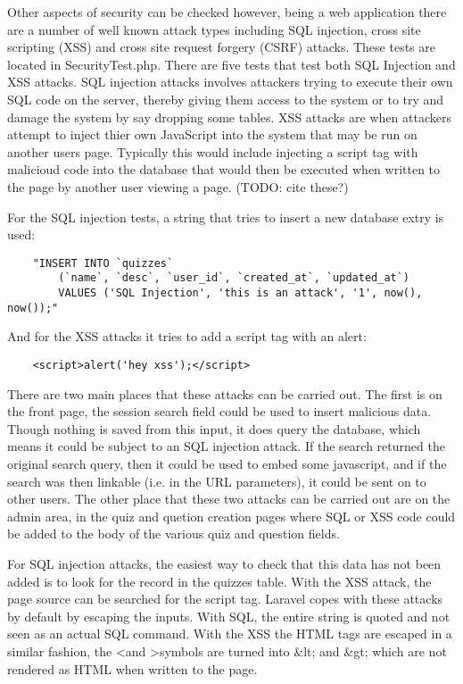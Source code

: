 Other aspects of security can be checked however, being a web application there are a number of well known attack types including SQL injection, cross site scripting (XSS) and cross site request forgery (CSRF) attacks. These tests are located in SecurityTest.php. There are five tests that test both SQL Injection and XSS attacks. SQL injection attacks involves attackers trying to execute their own SQL code on the server, thereby giving them access to the system or to try and damage the system by say dropping some tables. XSS attacks are when attackers attempt to inject thier own JavaScript into the system that may be run on another users page. Typically this would include injecting a script tag with malicioud code into the database that would then be executed when written to the page by another user viewing a page. (TODO: cite these?) 

For the SQL injection tests, a string that tries to insert a new database extry is used:
\begin{verbatim}
	"INSERT INTO `quizzes` 
		(`name`, `desc`, `user_id`, `created_at`, `updated_at`) 
		VALUES ('SQL Injection', 'this is an attack', '1', now(), now());"
\end{verbatim}
And for the XSS attacks it tries to add a script tag with an alert:
\begin{verbatim}
	<script>alert('hey xss');</script>
\end{verbatim} 

There are two main places that these attacks can be carried out. The first is on the front page, the session search field could be used to insert malicious data. Though nothing is saved from this input, it does query the database, which means it could be subject to an SQL injection attack. If the search returned the original search query, then it could be used to embed some javascript, and if the search was then linkable (i.e. in the URL parameters), it could be sent on to other users. The other place that these two attacks can be carried out are on the admin area, in the quiz and quetion creation pages where SQL or XSS code could be added to the body of the various quiz and question fields.

For SQL injection attacks, the easiest way to check that this data has not been added is to look for the record in the quizzes table. With the XSS attack, the page source can be searched for the script tag. Laravel copes with these attacks by default by escaping the inputs\cite{laravel-web-attacks}. With SQL, the entire string is quoted and not seen as an actual SQL command. With the XSS the HTML tags are escaped in a similar fashion, the \textless and \textgreater symbols are turned into \&lt; and \&gt; which are not rendered as HTML when written to the page.

